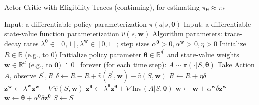 \documentclass[12pt,a4paper]{article}
\begin{document}
\begin{algorithm}
	\caption{Actor-Critic with Eligibility Traces (continuing), for estimating $\pi_{\bm{\theta}} \approx \pi_{*}$}
	\begin{algorithmic}                                                                                                   
		\State Input: a differentiable policy parameterization $\pi(a|s, \bm{\theta})$
		\State Input: a differentiable state-value function parameterization $\hat{v}(s, \mathbf{w})$
		\State Algorithm parameters: trace-decay rates $\lambda^{\bm{\theta}} \in [0, 1], \lambda^{\mathbf{w}} \in [0,1]$; step sizes $\alpha^{\bm{\theta}} > 0, \alpha^{\mathbf{w}} > 0, \eta > 0$
		\State Initialize $\bar{R} \in \mathbb{R}$ (e.g., to 0)
		\State Initialize policy parameter $\bm{\theta} \in \mathbb{R}^{d^{'}}$ and state-value weights $\mathbf{w} \in \mathbb{R}^{d}$ (e.g., to $\mathbf{0}) \doteq 0$
		\State
		\Loop\ forever (for each time step):
			\State $A \sim \pi(\cdot|S, \bm{\theta})$
			\State Take Action $A$, observe $S^{'}, R$
			\State $\delta \leftarrow R - \bar{R} + \hat{v}(S^{'}, \mathbf{w}) - \hat{v}(S, \mathbf{w})$
			\State $\bar{R} \leftarrow \bar{R} + \eta\delta$
			\State $\mathbf{z}^{\mathbf{w}} \leftarrow \lambda^{\mathbf{w}}\mathbf{z}^{\mathbf{w}} + \nabla\hat{v}(S, \mathbf{w})$
			\State $\mathbf{z}^{\bm{\theta}} \leftarrow \lambda^{\bm{\theta}}\mathbf{z}^{\bm{\theta}} + \nabla \text{ln}\pi(A|S, \bm{\theta})$
			\State $\mathbf{w} \leftarrow \mathbf{w} + \alpha^{\mathbf{w}}\delta\mathbf{z}^{\mathbf{w}}$
			\State $\mathbf{w} \leftarrow \bm{\theta} + \alpha^{\bm{\theta}}\delta\mathbf{z}^{\bm{\theta}}$
			\State $S \leftarrow S^{'}$
		\EndLoop
	\end{algorithmic}
\end{algorithm} 


\end{document}
